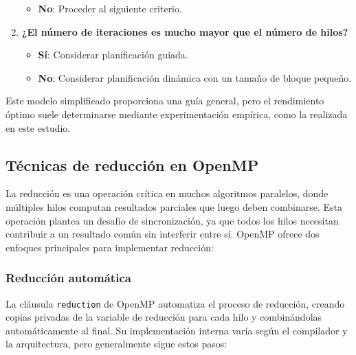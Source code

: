 \begin{enumerate}
\begin{itemize}
                        \item \textbf{No}: Proceder al siguiente criterio.
                        
                    \end{itemize}
                
                \item \textbf{¿El número de iteraciones es mucho mayor que el número de hilos?}
                
                    \begin{itemize}
                    
                        \item \textbf{Sí}: Considerar planificación guiada.
                        
                        \item \textbf{No}: Considerar planificación dinámica con un tamaño de bloque pequeño.
                        
                    \end{itemize}
                
            \end{enumerate}

            Este modelo simplificado proporciona una guía general, pero el rendimiento óptimo suele determinarse mediante experimentación empírica, como la realizada en este estudio.

    \subsection{Técnicas de reducción en OpenMP}
    
        La reducción es una operación crítica en muchos algoritmos paralelos, donde múltiples hilos computan resultados parciales que luego deben combinarse. Esta operación plantea un desafío de sincronización, ya que todos los hilos necesitan contribuir a un resultado común sin interferir entre sí. OpenMP ofrece dos enfoques principales para implementar reducción:
    
        \subsubsection{Reducción automática}

            La cláusula \texttt{reduction} de OpenMP automatiza el proceso de reducción, creando copias privadas de la variable de reducción para cada hilo y combinándolas automáticamente al final. Su implementación interna varía según el compilador y la arquitectura, pero generalmente sigue estos pasos:
            
